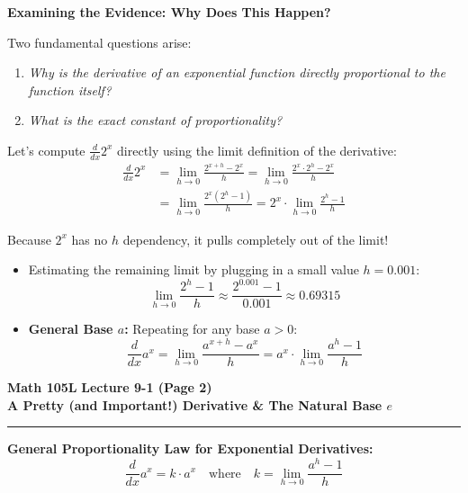 \documentclass[10.5pt]{article}
\begin{document}
\vspace{0.03in}

\textbf{\large Examining the Evidence: Why Does This Happen?}

Two fundamental questions arise:
\begin{enumerate}[leftmargin=1.4em, topsep=1pt, itemsep=1pt]
  \item \textit{Why is the derivative of an exponential function directly proportional to the function itself?}
  \item \textit{What is the exact constant of proportionality?}
\end{enumerate}

Let's compute $\frac{d}{dx} 2^x$ directly using the limit definition of the derivative:
\begin{align*}
  \frac{d}{dx} 2^x &= \lim_{h \to 0} \frac{2^{x+h} - 2^x}{h} = \lim_{h \to 0} \frac{2^x \cdot 2^h - 2^x}{h} \\
  &= \lim_{h \to 0} \frac{2^x(2^h - 1)}{h} = 2^x \cdot \lim_{h \to 0} \frac{2^h - 1}{h}
\end{align*}

Because $2^x$ has no $h$ dependency, it pulls completely out of the limit!
\begin{itemize}[leftmargin=1.2em, label=$\bullet$, topsep=1pt, itemsep=1pt]
  \item Estimating the remaining limit by plugging in a small value $h = 0.001$:
  \[
    \lim_{h \to 0} \frac{2^h - 1}{h} \approx \frac{2^{0.001} - 1}{0.001} \approx 0.69315
  \]
  \item \textbf{General Base $a$:} Repeating for any base $a > 0$:
  \[
    \frac{d}{dx} a^x = \lim_{h \to 0} \frac{a^{x+h} - a^x}{h} = a^x \cdot \lim_{h \to 0} \frac{a^h - 1}{h}
  \]
\end{itemize}

\newpage

\noindent \textbf{\large Math 105L} \hfill \textbf{\large Lecture 9-1 (Page 2)}\\[1pt]
{\textbf{\Large A Pretty (and Important!) Derivative \& The Natural Base $e$}}\\[-5pt]
\rule{\textwidth}{1.2pt}

\vspace{0.03in}

\begin{tcolorbox}[colback=boxbg, colframe=boxframe, boxrule=0.8pt, arc=3pt, left=8pt, right=8pt, top=4pt, bottom=4pt]
\textbf{General Proportionality Law for Exponential Derivatives:}\\[2pt]
\[
  \frac{d}{dx} a^x = k \cdot a^x \quad \text{where} \quad k = \lim_{h \to 0} \frac{a^h - 1}{h}
\]
\end{tcolorbox}
\end{document}
